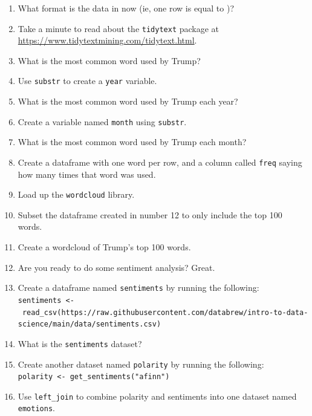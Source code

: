 \documentclass[
]{book}
\newenvironment{Shaded}{\begin{snugshade}}{\end{snugshade}}
\newcommand{\KeywordTok}[1]{\textcolor[rgb]{0.13,0.29,0.53}{\textbf{#1}}}
\newcommand{\NormalTok}[1]{#1}
\newcommand{\OperatorTok}[1]{\textcolor[rgb]{0.81,0.36,0.00}{\textbf{#1}}}
\newcommand{\StringTok}[1]{\textcolor[rgb]{0.31,0.60,0.02}{#1}}
\begin{document}
\begin{enumerate}
\def\labelenumi{\arabic{enumi}.}
\setcounter{enumi}{4}
\item
  What format is the data in now (ie, one row is equal to )?
\item
  Take a minute to read about the \texttt{tidytext} package at \url{https://www.tidytextmining.com/tidytext.html}.
\item
  What is the most common word used by Trump?
\item
  Use \texttt{substr} to create a \texttt{year} variable.
\item
  What is the most common word used by Trump each year?
\item
  Create a variable named \texttt{month} using \texttt{substr}.
\item
  What is the most common word used by Trump each month?
\item
  Create a dataframe with one word per row, and a column called \texttt{freq} saying how many times that word was used.
\item
  Load up the \texttt{wordcloud} library.
\item
  Subset the dataframe created in number 12 to only include the top 100 words.
\item
  Create a wordcloud of Trump's top 100 words.
\item
  Are you ready to do some sentiment analysis? Great.
\item
  Create a dataframe named \texttt{sentiments} by running the following: \texttt{sentiments\ \textless{}-\ read\_csv(\textquotesingle{}https://raw.githubusercontent.com/databrew/intro-to-data-science/main/data/sentiments.csv\textquotesingle{})}
\item
  What is the \texttt{sentiments} dataset?
\item
  Create another dataset named \texttt{polarity} by running the following: \texttt{polarity\ \textless{}-\ get\_sentiments("afinn")}
\item
  Use \texttt{left\_join} to combine polarity and sentiments into one dataset named \texttt{emotions}.
\end{enumerate}

\begin{Shaded}
\end{Shaded}
\end{document}
